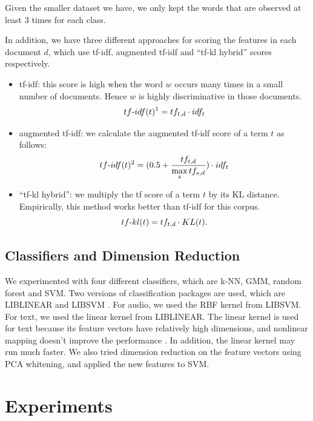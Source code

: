 \documentclass[a4paper]{article}
\begin{document}
Given the smaller dataset we have, we only kept the words that are observed at least 3 times for each class.

In addition, we have three different approaches for scoring the features in each document $d$, which use tf-idf, augmented tf-idf and ``tf-kl hybrid'' scores respectively.
\begin{itemize}
\item tf-idf: this score is high when the word $w$ occurs many times in a small number of documents. Hence $w$ is highly discriminative in those documents.
\begin{equation}
  tf\textnormal{-} idf(t)^1 =tf_{t,d} \cdot idf_{t} 
\label{tfidf1}
\end{equation}

\item augmented tf-idf:  we calculate the augmented tf-idf score of a term $t$ as follows:
\begin{equation}
  tf\textnormal{-} idf(t)^2 = (0.5 + \frac{tf_{t,d}}{\underset{s}{\max}\, tf_{s,d}}) \cdot idf_{t} 
\label{tfidf}
\end{equation}

\item ``tf-kl hybrid'': we multiply the tf score of a term $t$ by its KL distance. Empirically, this method works better than tf-idf for this corpus.
\begin{equation}
  tf\textnormal{-} kl(t) = tf_{t,d} \cdot KL(t).
\label{tfkl}
\end{equation}
\end{itemize}


\subsection{Classifiers and Dimension Reduction}
We experimented with four different classifiers, which are k-NN, GMM, random forest and SVM. Two versions of classification packages are used, which are LIBLINEAR \cite{liblin} and LIBSVM \cite{libsvm}. For audio, we used the RBF kernel from LIBSVM. For text, we used the linear kernel from LIBLINEAR. The linear kernel is used for text because its feature vectors have relatively high dimensions, and nonlinear mapping doesn't improve the performance \cite{svmguide}. In addition, the linear kernel may run much faster. We also tried dimension reduction on the feature vectors using PCA whitening, and applied the new features to SVM.

\section{Experiments}
\end{document}

